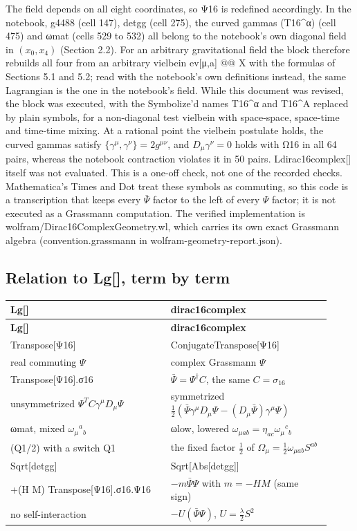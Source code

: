\documentclass[11pt]{article}
\begin{document}
The field depends on all eight coordinates, so Ψ16 is redefined accordingly. In the notebook, g4488 (cell 147), detgg (cell 275), the curved gammas (T16\textasciicircum{}α) (cell 475) and ωmat (cells 529 to 532) all belong to the notebook's own diagonal field in $(x_0,x_4)$ (Section 2.2). For an arbitrary gravitational field the block therefore rebuilds all four from an arbitrary vielbein ev[μ,a] @@ X with the formulas of Sections 5.1 and 5.2; read with the notebook's own definitions instead, the same Lagrangian is the one in the notebook's field. While this document was revised, the block was executed, with the Symbolize'd names T16\textasciicircum{}α and T16\textasciicircum{}A replaced by plain symbols, for a non-diagonal test vielbein with space-space, space-time and time-time mixing. At a rational point the vielbein postulate holds, the curved gammas satisfy $\{\gamma^\mu,\gamma^\nu\}=2g^{\mu\nu}$, and $D_\mu\gamma^\nu=0$ holds with Ω16 in all 64 pairs, whereas the notebook contraction violates it in 50 pairs. Ldirac16complex[] itself was not evaluated. This is a one-off check, not one of the recorded checks. Mathematica's Times and Dot treat these symbols as commuting, so this code is a transcription that keeps every $\bar\Psi$ factor to the left of every $\Psi$ factor; it is not executed as a Grassmann computation. The verified implementation is wolfram/Dirac16ComplexGeometry.wl, which carries its own exact Grassmann algebra (convention.grassmann in wolfram-geometry-report.json).

\subsection{Relation to Lg[], term by term}

\begin{longtable}{@{}p{0.460\linewidth}p{0.460\linewidth}@{}}
\toprule
\textbf{Lg[]} & \textbf{dirac16complex} \\
\midrule
\endfirsthead
\toprule
\textbf{Lg[]} & \textbf{dirac16complex} \\
\midrule
\endhead
Transpose[Ψ16] & ConjugateTranspose[Ψ16] \\
real commuting $\Psi$ & complex Grassmann $\Psi$ \\
Transpose[Ψ16].σ16 & $\bar\Psi=\Psi^\dagger C$, the same $C=\sigma_{16}$ \\
unsymmetrized $\Psi^TC\gamma^\mu D_\mu\Psi$ & symmetrized $\tfrac12(\bar\Psi\gamma^\mu D_\mu\Psi-(D_\mu\bar\Psi)\gamma^\mu\Psi)$ \\
ωmat, mixed $\omega_\mu{}^a{}_b$ & ωlow, lowered $\omega_{\mu ab}=\eta_{ac}\omega_\mu{}^c{}_b$ \\
(Q1/2) with a switch Q1 & the fixed factor $\tfrac12$ of $\Omega_\mu=\tfrac12\omega_{\mu ab}S^{ab}$ \\
Sqrt[detgg] & Sqrt[Abs[detgg]] \\
+(H M) Transpose[Ψ16].σ16.Ψ16 & $-m\bar\Psi\Psi$ with $m=-HM$ (same sign) \\
no self-interaction & $-U(\bar\Psi\Psi)$, $U=\tfrac\lambda2S^2$ \\
\bottomrule
\end{longtable}
\end{document}
